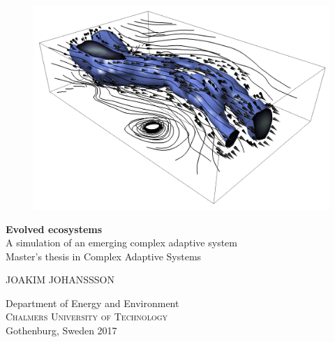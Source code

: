 

\newcommand{\reportTitle}{Evolved ecosystems}
\newcommand{\reportSubTitle}{A simulation of an emerging complex adaptive system}

\begin{titlepage}
			
\addtolength{\voffset}{2cm}

\begin{figure}[H]
\centering
\vspace{2cm}	%
\includegraphics[width=0.9\linewidth]{figure/Wind.png}
\end{figure}

\mbox{}
\vfill
\renewcommand{\familydefault}{\sfdefault} \normalfont %
\textbf{{\Huge \reportTitle{}}}\\[0.5cm]
{\Large \reportSubTitle{}}\\[0.5cm]
Master's thesis in Complex Adaptive Systems \setlength{\parskip}{1cm}

{\Large JOAKIM JOHANSSSON} \setlength{\parskip}{2.9cm}

Department of Energy and Environment \\
\textsc{Chalmers University of Technology} \\
Gothenburg, Sweden 2017

\renewcommand{\familydefault}{\rmdefault} \normalfont %
\end{titlepage}


